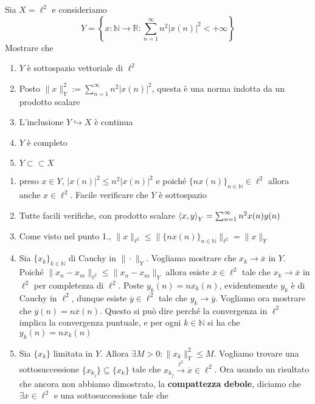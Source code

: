\begin{eser}{}
    Sia \(X = \ell^2\) e consideriamo 
    \[
      Y = \left\{x : \mathbb{N}\to \mathbb{R} : \sum_{n=1}^{\infty} n^2 |x{(n)}|^2 < +\infty \right\} 
    \]
    Mostrare che
\begin{enumerate}[label = \arabic*.]
    \item \(Y\) è sottospazio vettoriale di \(\ell^2\)
    \item Posto \(\|x\|^2_Y := \sum_{n=1}^{\infty} n^2 |x{(n)}|^2 \), questa è una norma indotta da un prodotto scalare
    \item L'inclusione \(Y \hookrightarrow X\) è continua
    \item \(Y\) è completo
    \item \(Y \subset \subset X  \) 
\end{enumerate}
\tcblower
\begin{enumerate}[label = \arabic*.]
    \item preso \(x \in Y\), \(|x{(n)}|^2 \le n^2 |x{(n)}|^2\) e poiché \(\{nx{(n)}\}_{n \in \mathbb{N}}  \in \ell^2\) allora anche \(x \in \ell^2\). Facile verificare che \(Y\) è sottospazio
    \item Tutte facili verifiche, con prodotto scalare \({\left\langle x,y\right\rangle}_Y = \sum_{n=1}^{\infty} n^2 x{(n)}y{(n)} \) 
    \item Come visto nel punto 1., \(\|x\|_{\ell^2} \le \|\{nx{(n)}\}_{n \in \mathbb{N}} \|_{\ell^2} = \|x\|_Y \) 
    \item Sia \(\{x_k\}_{k \in \mathbb{N}}  \) di Cauchy in \(\|\cdot \|_Y\).
        Vogliamo mostrare che \(x_k \to \overline{x}\) in \(Y\).
        Poiché \(\|x_n - x_m\|_{\ell^2} \le \|x_n - x_{m}\|_Y\) allora esiste \(\overline{x} \in \ell^2\) tale che \(x_k \to \overline{x}\) in \(\ell^2\) per completezza di \(\ell^2\).
        Poste \(y_k{(n)} = nx_k{(n)} \), evidentemente \(y_k\) è di Cauchy in \(\ell^2\), dunque esiste \(
        \overline{y} \in \ell^2\) tale che \(y_k \to \overline{y}\). Vogliamo
        ora mostrare che \(\overline{y}{(n)} = n \overline{x}{(n)}\). Questo si
        può dire perché la convergenza in \(\ell^2\) implica la convergenza
        puntuale, e per ogni \(k \in \mathbb{N}\) si ha che \(y_k{(n)} = n x_k{(n)}\)
    \item Sia \(\{x_k\} \) limitata in \(Y\). Allora \(\exists M > 0:
        \|x_k\|_Y^2 \le M\). Vogliamo trovare una sottosuccessione \(\{ x_{k_{j}}\} \subseteq \{x_k\} \) tale che \(x_{k_{j}} \overset{\ell^2}{\to } \overline{x} \in \ell^2\). Ora usando un risultato che ancora non abbiamo dimostrato, la \textbf{compattezza debole}, diciamo che \(\exists \overline{x} \in \ell^2\) e una sottosuccessione tale che

\end{enumerate}
\end{eser}
